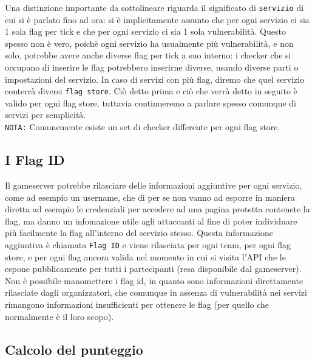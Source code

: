 Una distinzione importante da sottolineare riguarda il significato di \texttt{servizio} di cui si è parlato fino ad ora:
si è implicitamente assunto che per ogni servizio ci sia 1 sola flag per tick e che per ogni servizio ci sia 1 sola vulnerabilità.
Questo spesso non è vero, poichè ogni servizio ha usualmente più vulnerabilità, e non solo, potrebbe avere anche diverse flag per tick a suo interno:
i checker che si occupano di inserire le flag potrebbero inserirne diverse, usando diverse parti o impostazioni del servizio.
In caso di servizi con più flag, diremo che quel servizio conterrà diversi \texttt{flag store}.
Ciò detto prima e ciò che verrà detto in seguito è valido per ogni flag store, tuttavia continueremo a parlare spesso comunque di servizi per semplicità.\\

\texttt{NOTA:} Comunemente esiste un set di checker differente per ogni flag store.

\subsection{I Flag ID}

Il gameserver potrebbe rilasciare delle informazioni aggiuntive per ogni servizio, come ad esempio un username, che di per se non vanno
ad esporre in maniera diretta ad esempio le credenziali per accedere ad una pagina protetta contenete la flag, ma danno un infomazione utile agli attaccanti al fine di poter
individuare più facilmente la flag all'interno del servizio stesso.
Questa informazione aggiuntiva è chiamata \texttt{Flag ID} e viene rilasciata per ogni team, per ogni flag store, e per ogni flag ancora valida nel momento in cui si visita l'API che
le espone pubblicamente per tutti i partecipanti (resa disponibile dal gameserver). Non è possibile manomettere i flag id, in quanto sono informazioni direttamente rilasciate dagli
organizzatori, che comunque in assenza di vulnerabilità nei servizi rimangono informazioni insufficienti per ottenere le flag (per quello che normalmente è il loro scopo).

\subsection{Calcolo del punteggio}

